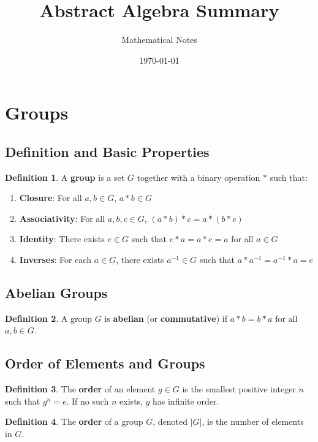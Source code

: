 \documentclass[11pt]{article}
\title{Abstract Algebra Summary}
\author{Mathematical Notes}
\date{\today}
\theoremstyle{definition}
\newtheorem{definition}{Definition}[section]
\begin{document}
\maketitle

\tableofcontents
\newpage

\section{Groups}

\subsection{Definition and Basic Properties}
\begin{definition}
A \textbf{group} is a set $G$ together with a binary operation $*$ such that:
\begin{enumerate}
    \item \textbf{Closure}: For all $a, b \in G$, $a * b \in G$
    \item \textbf{Associativity}: For all $a, b, c \in G$, $(a * b) * c = a * (b * c)$
    \item \textbf{Identity}: There exists $e \in G$ such that $e * a = a * e = a$ for all $a \in G$
    \item \textbf{Inverses}: For each $a \in G$, there exists $a^{-1} \in G$ such that $a * a^{-1} = a^{-1} * a = e$
\end{enumerate}
\end{definition}

\subsection{Abelian Groups}
\begin{definition}
A group $G$ is \textbf{abelian} (or \textbf{commutative}) if $a * b = b * a$ for all $a, b \in G$.
\end{definition}

\subsection{Order of Elements and Groups}
\begin{definition}
The \textbf{order} of an element $g \in G$ is the smallest positive integer $n$ such that $g^n = e$. If no such $n$ exists, $g$ has infinite order.
\end{definition}

\begin{definition}
The \textbf{order} of a group $G$, denoted $|G|$, is the number of elements in $G$.
\end{definition}
\end{document}
